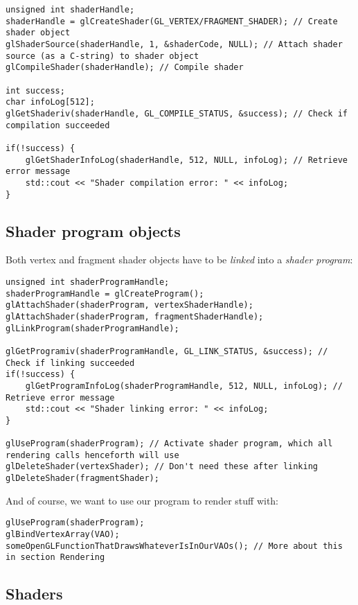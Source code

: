 \documentclass[8pt, table, xcdraw]{article}%
\begin{document}
\begin{lstlisting}
unsigned int shaderHandle;
shaderHandle = glCreateShader(GL_VERTEX/FRAGMENT_SHADER); // Create shader object
glShaderSource(shaderHandle, 1, &shaderCode, NULL); // Attach shader source (as a C-string) to shader object
glCompileShader(shaderHandle); // Compile shader

int success;
char infoLog[512];
glGetShaderiv(shaderHandle, GL_COMPILE_STATUS, &success); // Check if compilation succeeded

if(!success) {
    glGetShaderInfoLog(shaderHandle, 512, NULL, infoLog); // Retrieve error message
    std::cout << "Shader compilation error: " << infoLog;
}
\end{lstlisting}

\subsection{Shader program objects}

Both vertex and fragment shader objects have to be \emph{linked} into a \emph{shader program}:

\begin{lstlisting}
unsigned int shaderProgramHandle;
shaderProgramHandle = glCreateProgram();
glAttachShader(shaderProgram, vertexShaderHandle);
glAttachShader(shaderProgram, fragmentShaderHandle);
glLinkProgram(shaderProgramHandle);

glGetProgramiv(shaderProgramHandle, GL_LINK_STATUS, &success); // Check if linking succeeded
if(!success) {
    glGetProgramInfoLog(shaderProgramHandle, 512, NULL, infoLog); // Retrieve error message
    std::cout << "Shader linking error: " << infoLog;
}

glUseProgram(shaderProgram); // Activate shader program, which all rendering calls henceforth will use
glDeleteShader(vertexShader); // Don't need these after linking
glDeleteShader(fragmentShader);
\end{lstlisting}

And of course, we want to use our program to render stuff with:

\begin{lstlisting}
glUseProgram(shaderProgram);
glBindVertexArray(VAO);
someOpenGLFunctionThatDrawsWhateverIsInOurVAOs(); // More about this in section Rendering
\end{lstlisting}

\subsection{Shaders} \label{shaders}
\end{document}

